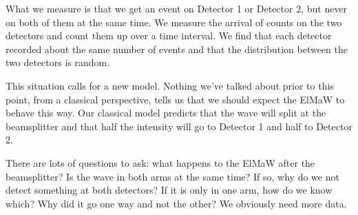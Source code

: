 What we measure is that we get an event on Detector 1 or Detector 2, but never on both of them at the same time.  We measure the arrival of counts on the two detectors and count them up over a time interval. We find that each detector recorded about the same number of events and that the distribution between the two detectors is random.

This situation calls for a new model. Nothing we've talked about prior to this point, from a classical perspective, tells us that we should expect the ElMaW to behave this way. Our classical model predicts that the wave will split at the beamsplitter and that half the intensity will go to Detector 1 and half to Detector 2.

There are lots of questions to ask: what happens to the ElMaW after the beamsplitter? Is the wave in both arms at the same time? If so, why do we not detect something at both detectors? If it is only in one arm, how do we know which? Why did it go one way and not the other? We obviously need more data.

